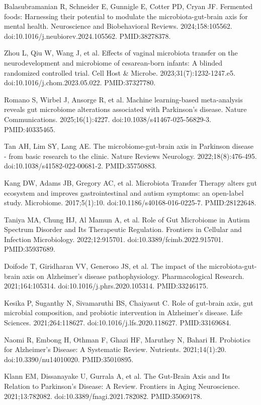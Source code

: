 \documentclass[12pt,oneside]{book}
\newcommand{\reff}[2]{\par\hangindent=7mm\hangafter=1\noindent[#1]\hspace{2mm}#2\par}
\begin{document}
\reff{60}{Balasubramanian R, Schneider E, Gunnigle E, Cotter PD, Cryan JF. Fermented foods: Harnessing their potential to modulate the microbiota-gut-brain axis for mental health. Neuroscience and Biobehavioral Reviews. 2024;158:105562. doi:10.1016/j.neubiorev.2024.105562. PMID:38278378.}

\reff{61}{Zhou L, Qiu W, Wang J, et al. Effects of vaginal microbiota transfer on the neurodevelopment and microbiome of cesarean-born infants: A blinded randomized controlled trial. Cell Host \& Microbe. 2023;31(7):1232-1247.e5. doi:10.1016/j.chom.2023.05.022. PMID:37327780.}

\reff{62}{Romano S, Wirbel J, Ansorge R, et al. Machine learning-based meta-analysis reveals gut microbiome alterations associated with Parkinson's disease. Nature Communications. 2025;16(1):4227. doi:10.1038/s41467-025-56829-3. PMID:40335465.}

\reff{63}{Tan AH, Lim SY, Lang AE. The microbiome-gut-brain axis in Parkinson disease - from basic research to the clinic. Nature Reviews Neurology. 2022;18(8):476-495. doi:10.1038/s41582-022-00681-2. PMID:35750883.}

\reff{64}{Kang DW, Adams JB, Gregory AC, et al. Microbiota Transfer Therapy alters gut ecosystem and improves gastrointestinal and autism symptoms: an open-label study. Microbiome. 2017;5(1):10. doi:10.1186/s40168-016-0225-7. PMID:28122648.}

\reff{65}{Taniya MA, Chung HJ, Al Mamun A, et al. Role of Gut Microbiome in Autism Spectrum Disorder and Its Therapeutic Regulation. Frontiers in Cellular and Infection Microbiology. 2022;12:915701. doi:10.3389/fcimb.2022.915701. PMID:35937689.}

\reff{66}{Doifode T, Giridharan VV, Generoso JS, et al. The impact of the microbiota-gut-brain axis on Alzheimer's disease pathophysiology. Pharmacological Research. 2021;164:105314. doi:10.1016/j.phrs.2020.105314. PMID:33246175.}

\reff{67}{Kesika P, Suganthy N, Sivamaruthi BS, Chaiyasut C. Role of gut-brain axis, gut microbial composition, and probiotic intervention in Alzheimer's disease. Life Sciences. 2021;264:118627. doi:10.1016/j.lfs.2020.118627. PMID:33169684.}

\reff{68}{Naomi R, Embong H, Othman F, Ghazi HF, Maruthey N, Bahari H. Probiotics for Alzheimer's Disease: A Systematic Review. Nutrients. 2021;14(1):20. doi:10.3390/nu14010020. PMID:35010895.}

\reff{69}{Klann EM, Dissanayake U, Gurrala A, et al. The Gut-Brain Axis and Its Relation to Parkinson's Disease: A Review. Frontiers in Aging Neuroscience. 2021;13:782082. doi:10.3389/fnagi.2021.782082. PMID:35069178.}
\end{document}
